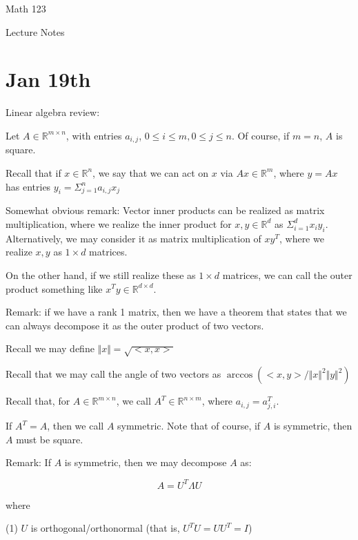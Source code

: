 \documentclass[10pt]{article}
\begin{document}
\begin{Large}
\centerline{Math 123}
\centerline{Lecture Notes}  %
\centerline{\bf }       %
\centerline{}      %
\end{Large}


\vspace{2em}
\section*{Jan 19th}

Linear algebra review:

Let $A \in \mathbb{R}^{m \times n}$, with entries $a_{i,j}$, $0 \leq i \leq m, 0 \leq j \leq n$. Of course, if $m=n$, $A$ is square.

Recall that if $x \in \mathbb{R}^n$, we say that we can act on $x$ via $Ax \in \mathbb{R}^m$, where $y= Ax$ has entries $y_i = \Sigma_{j=1}^n a_{i,j} x_j$

Somewhat obvious remark: Vector inner products can be realized as matrix multiplication, where we realize the inner product for $x,y \in \mathbb{R}^d$ as $\Sigma_{i=1}^d x_i y_i$. Alternatively, we may consider it as matrix multiplication of $xy^T$, where we realize $x,y$ as $1\times d$ matrices.

On the other hand, if we still realize these as $1 \times d$ matrices, we can call the outer product something like $x^T y \in \mathbb{R}^{d \times d}$.

Remark: if we have a rank 1 matrix, then we have a theorem that states that we can always decompose it as the outer product of two vectors.

Recall we may define $\Vert x \Vert = \sqrt{ < x, x > }$

Recall that we may call the angle of two vectors as $\arccos \left( < x, y > / \Vert x \Vert^2 \Vert y \Vert^2 \right)$

Recall that, for $A \in \mathbb{R}^{m \times n}$, we call $A^T \in \mathbb{R}^{n \times m}$, where $a_{i,j} = a^T_{j,i}$.

If $A^T = A$, then we call $A$ symmetric. Note that of course, if $A$ is symmetric, then $A$ must be square.

Remark: If $A$ is symmetric, then we may decompose $A$ as:

$$ A = U^T \Lambda  U$$

where

(1) $U$ is orthogonal/orthonormal (that is, $U^T U = U U^T = I$)
\end{document}

